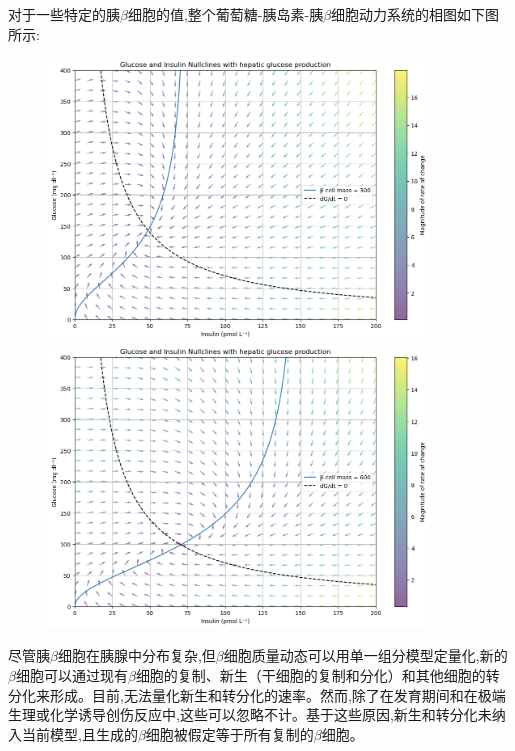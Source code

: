 对于一些特定的胰$\beta$细胞的值,整个葡萄糖-胰岛素-胰$\beta$细胞动力系统的相图如下图所示:
\begin{figure}[H]
    \begin{minipage}[t]{0.5\textwidth}
        \centering
        \includegraphics[width=0.9\textwidth]{Img/phase_300.png}
    \end{minipage}
    \begin{minipage}[t]{0.5\textwidth}
        \centering
        \includegraphics[width=0.9\textwidth]{Img/phase_600.png}
    \end{minipage}
    \label{fig:phase}
\end{figure}

尽管胰$\beta$细胞在胰腺中分布复杂,但$\beta$细胞质量动态可以用单一组分模型定量化,新的$\beta$细胞可以通过现有$\beta$细胞的复制、新生（干细胞的复制和分化）和其他细胞的转分化来形成。目前,无法量化新生和转分化的速率。然而,除了在发育期间和在极端生理或化学诱导创伤反应中,这些可以忽略不计\cite{finegood1995dynamics}。基于这些原因,新生和转分化未纳入当前模型,且生成的$\beta$细胞被假定等于所有复制的$\beta$细胞。

